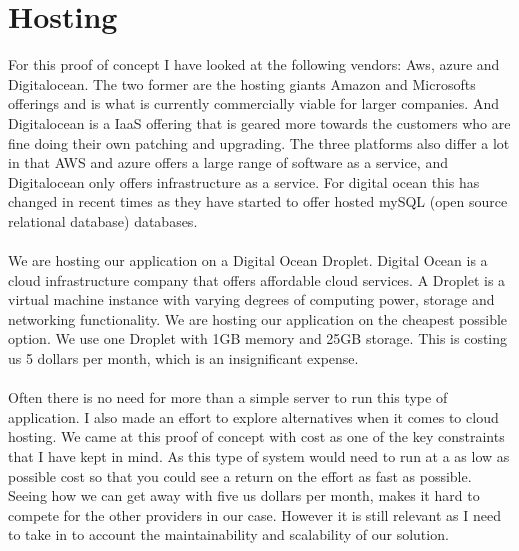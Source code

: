 \documentclass[]{uiophd}
\begin{document}
\section{Hosting}
For this proof of concept I have looked at the following vendors: Aws, azure and Digitalocean. The two former are the hosting giants Amazon and Microsofts offerings and is what is currently commercially viable for larger companies. And Digitalocean is a IaaS offering that is geared more towards the customers who are fine doing their own patching and upgrading. The three platforms also differ a lot in that AWS and azure offers a large range of software as a service, and Digitalocean only offers infrastructure as a service. For digital ocean this has changed in recent times as they have started to offer hosted mySQL (open source relational database) databases.
\\\\
We are hosting our application on a Digital Ocean Droplet. Digital Ocean is a cloud infrastructure company that offers affordable cloud services. A Droplet is a virtual machine instance with varying degrees of computing power, storage and networking functionality. We are hosting our application on the cheapest possible option. We use one Droplet with 1GB memory and 25GB storage. This is costing us 5 dollars per month, which is an insignificant expense. 
\\\\
Often there is no need for more than a simple server to run this type of application. I also made an effort to explore alternatives when it comes to cloud hosting. We came at this proof of concept with cost as one of the key constraints that I have kept in mind. As this type of system would need to run at a as low as possible cost so that you could see a return on the effort as fast as possible. Seeing how we can get away with five us dollars per month, makes it hard to compete for the other providers in our case. However it is still relevant as I need to take in to account the maintainability and scalability of our solution.
\end{document}
